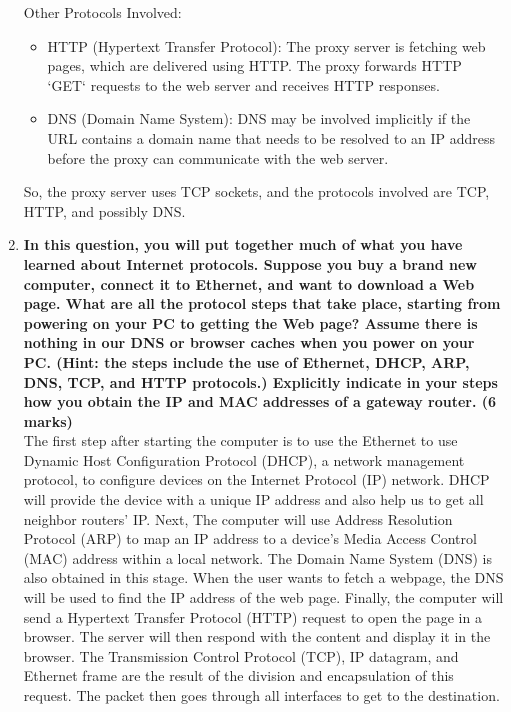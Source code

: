 \documentclass[11pt]{article}
\begin{document}
\begin{enumerate}
		Other Protocols Involved:
		
			\begin{itemize}
				\item HTTP (Hypertext Transfer Protocol): The proxy server is fetching web pages, which are delivered using HTTP. The proxy forwards HTTP `GET` requests to the web server and receives HTTP responses.
				\item DNS (Domain Name System): DNS may be involved implicitly if the URL contains a domain name that needs to be resolved to an IP address before the proxy can communicate with the web server.
			\end{itemize}
		So, the proxy server uses TCP sockets, and the protocols involved are TCP, HTTP, and possibly DNS.
		
		\item \textbf{In this question, you will put together much of what you have learned about Internet protocols. Suppose you buy a brand new computer, connect it to Ethernet, and want to download a Web page. What are all the protocol steps that take place, starting from powering on your PC to getting the Web page? Assume there is nothing in our DNS or browser caches when you power on your PC. (Hint: the steps include the use of Ethernet, DHCP, ARP, DNS, TCP, and HTTP protocols.) Explicitly indicate in your steps how you obtain the IP and MAC addresses of a gateway router. (6 marks)}\\
		
		The first step after starting the computer is to use the Ethernet to use Dynamic Host Configuration Protocol (DHCP), a network management protocol, to configure devices on the Internet Protocol (IP) network. DHCP will provide the device with a unique IP address and also help us to get all neighbor routers' IP. Next, The computer will use Address Resolution Protocol (ARP) to map an IP address to a device's Media Access Control (MAC) address within a local network. The Domain Name System (DNS) is also obtained in this stage. When the user wants to fetch a webpage, the DNS will be used to find the IP address of the web page. Finally, the computer will send a Hypertext Transfer Protocol (HTTP) request to open the page in a browser. The server will then respond with the content and display it in the browser. The Transmission Control Protocol (TCP), IP datagram, and Ethernet frame are the result of the division and encapsulation of this request. The packet then goes through all interfaces to get to the destination.\\
	\end{enumerate}
\end{document}
